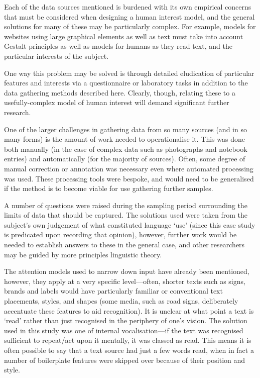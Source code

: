Each of the data sources mentioned is burdened with its own empirical concerns that must be considered when designing a human interest model, and the general solutions for many of these may be particularly complex.  For example, models for websites using large graphical elements as well as text must take into account Gestalt principles as well as models for humans as they read text, and the particular interests of the subject.

One way this problem may be solved is through detailed eludication of particular features and interests via a questionnaire or laboratory tasks in addition to the data gathering methods described here.  Clearly, though, relating these to a usefully-complex model of human interest will demand significant further research.




One of the larger challenges in gathering data from so many sources (and in so many forms) is the amount of work needed to operationalise it.  This was done both manually (in the case of complex data such as photographs and notebook entries) and automatically (for the majority of sources).  Often, some degree of manual correction or annotation was necessary even where automated processing was used.  These processing tools were bespoke, and would need to be generalised if the method is to become viable for use gathering further samples.



A number of questions were raised during the sampling period surrounding the limits of data that should be captured.  The solutions used were taken from the subject's own judgement of what constituted language `use' (since this case study is predicated upon recording that opinion), however, further work would be needed to establish answers to these in the general case, and other researchers may be guided by more principles linguistic theory.


The attention models used to narrow down input have already been mentioned, however, they apply at a very specific level---often, shorter texts such as signs, brands and labels would have particularly familiar or conventional text placements, styles, and shapes (some media, such as road signs, deliberately accentuate these features to aid recognition).  It is unclear at what point a text is `read' rather than just recognised in the periphery of one's vision.  The solution used in this study was one of internal vocalisation---if the text was recognised sufficient to repeat/act upon it mentally, it was classed as read.  This means it is often possible to say that a text source had just a few words read, when in fact a number of boilerplate features were skipped over because of their position and style.



